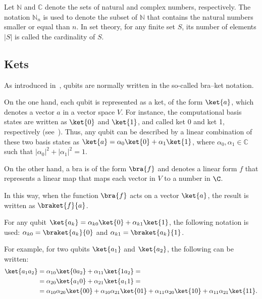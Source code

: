 \documentclass[sigconf,natbib=false]{acmart}
\begin{document}
Let $\mathbb{N}$ and $\mathbb{C}$ denote the sets of natural and complex numbers, respectively. The notation $\mathbb{N}_n$ is used to denote the subset of $\mathbb{N}$ that contains the natural numbers smaller or equal than $n$.
In set theory, for any finite set $S$, its number of elements  $|S|$ is called the cardinality of $S$.

\subsection{Kets}

As introduced in~\cite{diracBraket},  qubits are normally written in the so-called bra–ket notation.

On the one hand, each qubit is represented as a ket, of the form $\ket{a}$,  which denotes a vector $a$ in a vector space $V$.
For instance, the computational basis states are written  as $\ket{0}$ and $\ket{1}$, and called ket 0 and ket 1, respectively (see~\cite{Nielsen_Chuang_2010}).
Thus, any qubit can be described by a linear combination of these two basis states as $\ket{a} =\alpha_0\ket{0} +\alpha_1 \ket{1}$, where $\alpha_0,  \alpha_1 \in \mathbb{C}$ such that $ |\alpha_0|^{2}+|\alpha_1|^{2}=1$.

On the other hand, a bra is of the form $\bra{f}$ and denotes a linear form $f$ that represents a linear map that maps each vector in $V$
to a number in $\C$.

In this way,  when the function $\bra{f}$ acts on a vector $\ket{a}$, the result  is written as $\braket{f}{a}$.

\begin{notation}
For any qubit $\ket{a_k}=\alpha_{k0}\ket{0} +\alpha_{k1} \ket{1}$, the following notation is used:
$\alpha_{k0}=\braket{a_k}{0}$ and $\alpha_{k1}=\braket{a_k}{1}$.
\end{notation}

For example, for two qubits $\ket{a_1}$ and $\ket{a_2}$, the following can be written:
\begin{align}
\label{eq:2qubit-coordenadas}
\ket{a_1a_2}&=\alpha_{10}\ket{0a_2}+\alpha_{11}\ket{1a_2}=\\
&=\alpha_{20}\ket{a_10}+\alpha_{21}\ket{a_11}=\\
&=\alpha_{10} \alpha_{20}\ket{00}+\alpha_{10} \alpha_{21}\ket{01}+\alpha_{11} \alpha_{20}\ket{10}+\alpha_{11} \alpha_{21}\ket{11}.
\end{align}
\end{document}
